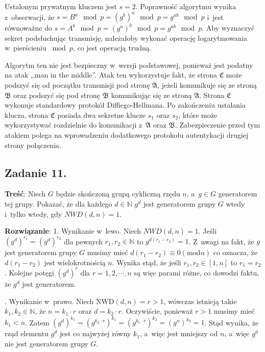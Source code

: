 \documentclass[a4paper,10pt, twocolumn]{article}
\begin{document}
\noindent Ustalonym prywatnym kluczem jest $s = 2$. Poprawność algorytmu wynika z~obserwacji, że $s = B^{a} \mod p = (g^{b})^{a} \mod p = g^{ab} \mod p$ i~jest równoważne do $s = A^{b} \mod p = (g^{a})^{b} \mod p = g^{ab} \mod p$. Aby wyznaczyć sekret podsłuchując transmisję, należałoby wykonać operację logarytmowania w~pierścieniu $\bmod{p}$, co jest operacją trudną.

\noindent Algorytm ten nie jest bezpieczny w~wersji podstawowej, ponieważ jest podatny na atak ,,man in the middle''. Atak ten wykorzystuje fakt, że strona $\mathfrak{C}$ może podszyć się od początku transmisji pod stronę $\mathfrak{A}$, jeżeli komunikuje się ze stroną $\mathfrak{B}$ oraz podszyć się pod stronę $\mathfrak{B}$ komunikując się ze stroną $\mathfrak{A}$. Strona $\mathfrak{C}$ wykonuje standardowy protokół Diffiego-Hellmana. Po zakończeniu ustalania klucza, strona $\mathfrak{C}$ posiada dwa sekretne klucze $s_{1}$ oraz $s_{2}$, które może wykorzystywać rozdzielnie do komunikacji z~$\mathfrak{A}$ oraz $\mathfrak{B}$. Zabezpieczenie przed tym atakiem polega na wprowadzeniu dodatkowego protokołu autentykacji drugiej strony połączenia.  

\subsection{Zadanie 11.}

\textbf{Treść}: Niech $G$ będzie skończoną grupą cykliczną rzędu $n$, a~$g \in G$ generatorem tej grupy. Pokazać, że dla każdego $d \in \mathbb{N}$ $g^{d}$ jest generatorem grupy $G$ wtedy i~tylko wtedy, gdy $NWD(d,n) = 1$.

\textbf{Rozwiązanie}: 1. Wynikanie w~lewo. Niech $NWD(d,n) = 1$. Jeśli $(g^{d})^{r_{1}} = (g^{d})^{r_{2}}$ dla pewnych $r_{1}, r_{2} \in \mathbb{N}$ to $g^{d(r_{1} - r_{2})} = 1$. Z~uwagi na fakt, że $g$ jest generatorem grupy $G$ musimy mieć $d(r_{1} - r_{2}) \equiv 0 (\text{mod}n)$ co oznacza, że $d(r_{1} - r_{2})$ jest wielokrotnością $n$. Wynika stąd, że jeśli $r_{1}, r_{2} \in [1, n]$ to $r_{1} = r_{2}$. Kolejne potęgi $(g^{d})^{r}$ dla $r = 1, 2, \cdots, n$ są więc parami różne, co dowodzi faktu, że $g^{d}$ jest generatorem. 

. Wynikanie w~prawo. Niech $\text{NWD}(d,n) = r > 1$, wówczas istnieją takie $k_{1}, k_{2} \in \mathbb{N}$, że $n = k_{1} \cdot r$ oraz $d = k_{2} \cdot r$. Oczywiście, ponieważ $r > 1$ musimy mieć $k_{1} < n$. Zatem $(g^{d})^{k_{1}} = (g^{k_{2} \cdot r})^{k_{1}} = (g^{k_{1} \cdot r})^{k_{2}} = (g^{n})^{k_{2}} = 1$. Stąd wynika, że rząd elementu $g^{d}$ jest co najwyżej równy $k_{1}$, a~więc jest mniejszy od $n$, a~więc $g^{d}$ nie jest generatorem grupy $G$.
\end{document}

